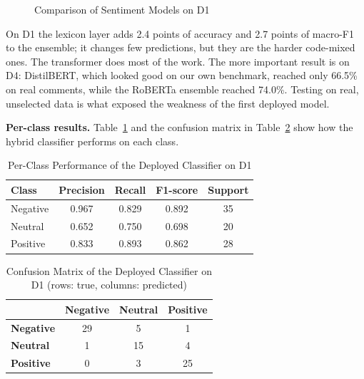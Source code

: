 \documentclass[12pt,a4paper]{report}
\newcommand{\cellpadding}{\renewcommand{\arraystretch}{1.2}}
\begin{document}
\begin{figure}[!htbp]
\centering
{}
\caption{Comparison of Sentiment Models on D1}
\label{fig:modelcmp}
\end{figure}

On D1 the lexicon layer adds 2.4 points of accuracy and 2.7 points of macro-F1 to the ensemble; it changes few predictions, but they are the harder code-mixed ones. The transformer does most of the work. The more important result is on D4: DistilBERT, which looked good on our own benchmark, reached only 66.5\% on real comments, while the RoBERTa ensemble reached 74.0\%. Testing on real, unselected data is what exposed the weakness of the first deployed model.

\textbf{Per-class results.} Table~\ref{tab:perclass} and the confusion matrix in Table~\ref{tab:confusion} show how the hybrid classifier performs on each class.

\begin{table}[H]
\centering
\cellpadding
\caption{Per-Class Performance of the Deployed Classifier on D1}
\label{tab:perclass}
\begin{tabular}{|l|c|c|c|c|}
\hline
\textbf{Class} & \textbf{Precision} & \textbf{Recall} & \textbf{F1-score} & \textbf{Support} \\
\hline
Negative & 0.967 & 0.829 & 0.892 & 35 \\
\hline
Neutral & 0.652 & 0.750 & 0.698 & 20 \\
\hline
Positive & 0.833 & 0.893 & 0.862 & 28 \\
\hline
\end{tabular}
\end{table}

\begin{table}[H]
\centering
\cellpadding
\caption{Confusion Matrix of the Deployed Classifier on D1 (rows: true, columns: predicted)}
\label{tab:confusion}
\begin{tabular}{|l|c|c|c|}
\hline
 & \textbf{Negative} & \textbf{Neutral} & \textbf{Positive} \\
\hline
\textbf{Negative} & 29 & 5 & 1 \\
\hline
\textbf{Neutral} & 1 & 15 & 4 \\
\hline
\textbf{Positive} & 0 & 3 & 25 \\
\hline
\end{tabular}
\end{table}
\end{document}
